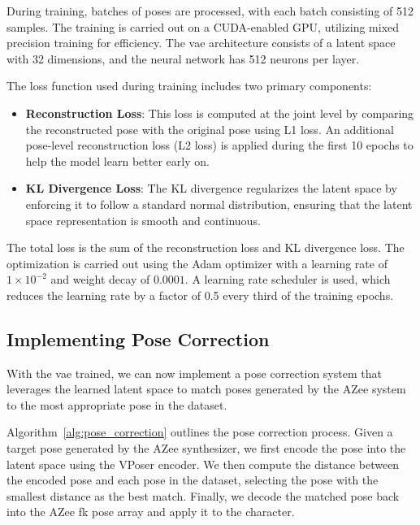 \documentclass[../../main.tex]{subfiles}
\begin{document}
During training, batches of poses are processed, with each batch consisting of 512 samples. The training is carried out on a CUDA-enabled GPU, utilizing mixed precision training for efficiency. The \gls{vae} architecture consists of a latent space with 32 dimensions, and the neural network has 512 neurons per layer. 

The loss function used during training includes two primary components: 
\begin{itemize}
    \item \textbf{Reconstruction Loss}: This loss is computed at the joint level by comparing the reconstructed pose with the original pose using L1 loss. An additional pose-level reconstruction loss (L2 loss) is applied during the first 10 epochs to help the model learn better early on.
    \item \textbf{KL Divergence Loss}: The KL divergence regularizes the latent space by enforcing it to follow a standard normal distribution, ensuring that the latent space representation is smooth and continuous.
\end{itemize}

The total loss is the sum of the reconstruction loss and KL divergence loss. The optimization is carried out using the Adam optimizer with a learning rate of $1 \times 10^{-2}$ and weight decay of $0.0001$. A learning rate scheduler is used, which reduces the learning rate by a factor of 0.5 every third of the training epochs. 

\subsection{Implementing Pose Correction}
\label{ch:intermediate_blocks_pose_correction:pose_correction_with_azee:implementation}

With the \gls{vae} trained, we can now implement a pose correction system that leverages the learned latent space to match poses generated by the AZee system to the most appropriate pose in the dataset.

Algorithm~\ref{alg:pose_correction} outlines the pose correction process. Given a target pose generated by the AZee synthesizer, we first encode the pose into the latent space using the VPoser encoder. We then compute the distance between the encoded pose and each pose in the dataset, selecting the pose with the smallest distance as the best match. Finally, we decode the matched pose back into the AZee \gls{fk} pose array and apply it to the character.
\end{document}
